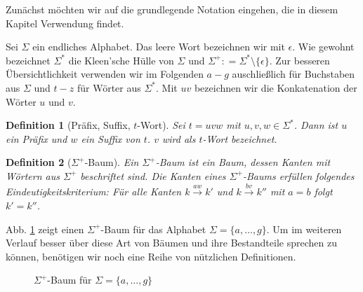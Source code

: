 \documentclass[12pt]{report}
\newtheorem{definition}{Definition}
\newcommand{\coloneqq}{\mathrel{\mathop:}=}
\begin{document}
Zunächst möchten wir auf die grundlegende Notation eingehen, die in diesem Kapitel Verwendung findet.

Sei $\Sigma$ ein endliches Alphabet. Das leere Wort bezeichnen wir mit $\epsilon$. Wie gewohnt bezeichnet $\Sigma^*$ die Kleen'sche Hülle von $\Sigma$ und $\Sigma^+ \coloneqq \Sigma^* \setminus \{\epsilon\}$. Zur besseren Übersichtlichkeit verwenden wir im Folgenden $a - g$ auschließlich für Buchstaben aus $\Sigma$ und $t - z$ für Wörter aus $\Sigma^*$. Mit $uv$ bezeichnen wir die Konkatenation der Wörter $u$ und $v$.

\begin{definition}[Präfix, Suffix, $t$-Wort]
Sei $t = uvw$ mit $u, v, w \in \Sigma^*$. Dann ist $u$ ein Präfix und $w$ ein Suffix von $t$. $v$ wird als $t$-Wort bezeichnet.
\end{definition}

\begin{definition}[$\Sigma^+$-Baum]
Ein $\Sigma^+$-Baum ist ein Baum, dessen Kanten mit Wörtern aus $\Sigma^+$ beschriftet sind. Die Kanten eines $\Sigma^+$-Baums erfüllen folgendes Eindeutigkeitskriterium: Für alle Kanten $k \xrightarrow{aw} k'$ und $k \xrightarrow{bv} k''$ mit $a = b$ folgt $k' = k''$.
\label{def:SigmaPlusBaum}
\end{definition}

Abb. \ref{fig:SigmaPlusTree} zeigt einen $\Sigma^+$-Baum für das Alphabet $\Sigma = \{a, \dots, g \}$. Um im weiteren Verlauf besser über diese Art von Bäumen und ihre Bestandteile sprechen zu können, benötigen wir noch eine Reihe von nützlichen Definitionen.

\begin{figure}[htb]
\centering
{}
\caption{$\Sigma^+$-Baum für $\Sigma = \{a, \dots, g\}$}
\label{fig:SigmaPlusTree}
\end{figure}
\end{document}
